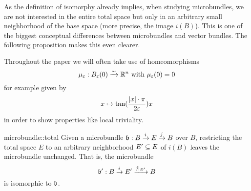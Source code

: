 \begin{myparagraph}
    As the definition of isomorphy already implies, when studying microbundles,
    we are not interested in the entire total space
    but only in an arbitrary small neighborhood of the base space (more precise, the image $i(B)$).
    This is one of the biggest conceptual differences between
    microbundles and vector bundles.
    The following proposition makes this even clearer.
    
    Throughout the paper we will often take use of homeomorphisms
    \[ \mu_\eps: \ball[\eps] \isomto \R^n \twith \mu_\eps(0) = 0 \]
    for example given by
    \[ x \mapsto \tan(\frac{\abs{x}\cdot\pi}{2\eps}) x \]
    in order to show properties like local triviality.
\end{myparagraph}

\begin{myproposition}{microbundle::total}{}
    Given a microbundle $\bundledef{\bb}{B}{E}{i}{j}$ over $B$,
    restricting the total space $E$ to an
    arbitrary neighborhood $E' \sub E$ of $i(B)$ leaves the microbundle unchanged.
    That is, the microbundle
    \[ \bundledef{\bb'}{B}{E'}{i}{j\restr{E'}} \]
    is isomorphic to $\bb$.
\end{myproposition}

